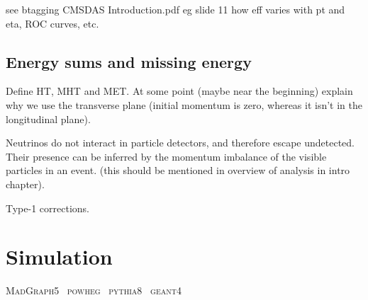 see btagging CMSDAS Introduction.pdf
eg slide 11 how eff varies with pt and eta, ROC curves, etc.

\subsection{Energy sums and missing energy}

Define HT, MHT and MET. At some point (maybe near the beginning) explain why we 
use  the transverse plane (initial momentum is zero, whereas it isn't in the 
longitudinal plane).

Neutrinos do not interact in particle detectors, and therefore escape 
undetected. Their presence can be inferred by the momentum imbalance of the 
visible particles in an event. (this should be mentioned in overview of 
analysis in intro chapter).

Type-1 corrections.


\section{Simulation}
\label{sec:detector-simulation}

\textsc{MadGraph5}~\cite{madgraph}
\textsc{powheg}~\cite{powheg}
\textsc{pythia8}~\cite{pythia}
\textsc{geant4}~\cite{geant}

